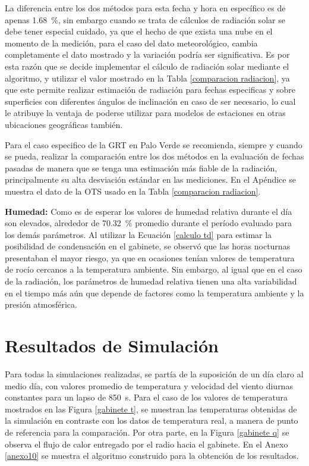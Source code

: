 La diferencia entre los dos métodos para esta fecha y hora en específico es de apenas \SI{1,68}{\percent}, sin embargo cuando se trata de cálculos de radiación solar se debe tener especial cuidado, ya que el hecho de que exista una nube en el momento de la medición, para el caso del dato meteorológico, cambia completamente el dato mostrado y la variación podría ser significativa. Es por esta razón que se decide implementar el cálculo de radiación solar mediante el algoritmo, y utilizar el valor mostrado en la Tabla \ref{comparacion radiacion}, ya que este permite realizar estimación de radiación para fechas especificas y sobre superficies con diferentes ángulos de inclinación en caso de ser necesario, lo cual le atribuye la ventaja de  poderse utilizar para modelos de estaciones en otras ubicaciones geográficas también.

Para el caso especifico de la GRT en Palo Verde se recomienda, siempre y cuando se pueda, realizar la comparación entre los dos métodos en la evaluación de fechas pasadas de manera que se tenga una estimación más fiable de la radiación, principalmente su alta desviación estándar en las mediciones. En el Apéndice se muestra el dato de la OTS usado en la Tabla \ref{comparacion radiacion}.

\textbf{Humedad:} Como es de esperar los valores de humedad relativa durante el día son elevados, alrededor de \SI{70,32}{\percent} promedio durante el período evaluado para los demás parámetros. Al utilizar la Ecuación \ref{calculo td} para estimar la posibilidad de condensación en el gabinete, se observó que las horas nocturnas presentaban el mayor riesgo, ya que en ocasiones tenían valores de temperatura de rocío cercanos a la temperatura ambiente. Sin embargo, al igual que en el caso de la radiación, los parámetros de humedad relativa tienen una alta variabilidad en el tiempo más aún que depende de factores como la temperatura ambiente y la presión atmosférica.


\section{Resultados de Simulación}

Para todas la simulaciones realizadas, se partía de la suposición de un día claro al medio día, con valores promedio de temperatura y velocidad del viento diurnas constantes para un lapso de \SI{850}{\second}. Para el caso de los valores de temperatura mostrados en las Figura \ref{gabinete t}, se muestran las temperaturas obtenidas de la simulación en contraste con los datos de temperatura real, a manera de punto de referencia para la comparación. Por otra parte, en la Figura \ref{gabinete q} se observa el flujo de calor entregado por el radio hacia el gabinete. En el Anexo \ref{anexo10} se muestra el algoritmo construido para la obtención de los resultados.

